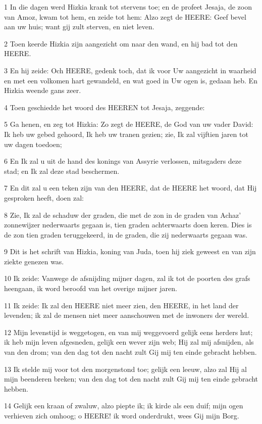 \par 1 In die dagen werd Hizkia krank tot stervens toe; en de profeet Jesaja, de zoon van Amoz, kwam tot hem, en zeide tot hem: Alzo zegt de HEERE: Geef bevel aan uw huis; want gij zult sterven, en niet leven.
\par 2 Toen keerde Hizkia zijn aangezicht om naar den wand, en hij bad tot den HEERE.
\par 3 En hij zeide: Och HEERE, gedenk toch, dat ik voor Uw aangezicht in waarheid en met een volkomen hart gewandeld, en wat goed in Uw ogen is, gedaan heb. En Hizkia weende gans zeer.
\par 4 Toen geschiedde het woord des HEEREN tot Jesaja, zeggende:
\par 5 Ga henen, en zeg tot Hizkia: Zo zegt de HEERE, de God van uw vader David: Ik heb uw gebed gehoord, Ik heb uw tranen gezien; zie, Ik zal vijftien jaren tot uw dagen toedoen;
\par 6 En Ik zal u uit de hand des konings van Assyrie verlossen, mitsgaders deze stad; en Ik zal deze stad beschermen.
\par 7 En dit zal u een teken zijn van den HEERE, dat de HEERE het woord, dat Hij gesproken heeft, doen zal:
\par 8 Zie, Ik zal de schaduw der graden, die met de zon in de graden van Achaz' zonnewijzer nederwaarts gegaan is, tien graden achterwaarts doen keren. Dies is de zon tien graden teruggekeerd, in de graden, die zij nederwaarts gegaan was.
\par 9 Dit is het schrift van Hizkia, koning van Juda, toen hij ziek geweest en van zijn ziekte genezen was.
\par 10 Ik zeide: Vanwege de afsnijding mijner dagen, zal ik tot de poorten des grafs heengaan, ik word beroofd van het overige mijner jaren.
\par 11 Ik zeide: Ik zal den HEERE niet meer zien, den HEERE, in het land der levenden; ik zal de mensen niet meer aanschouwen met de inwoners der wereld.
\par 12 Mijn levenstijd is weggetogen, en van mij weggevoerd gelijk eens herders hut; ik heb mijn leven afgesneden, gelijk een wever zijn web; Hij zal mij afsnijden, als van den drom; van den dag tot den nacht zult Gij mij ten einde gebracht hebben.
\par 13 Ik stelde mij voor tot den morgenstond toe; gelijk een leeuw, alzo zal Hij al mijn beenderen breken; van den dag tot den nacht zult Gij mij ten einde gebracht hebben.
\par 14 Gelijk een kraan of zwaluw, alzo piepte ik; ik kirde als een duif; mijn ogen verhieven zich omhoog; o HEERE! ik word onderdrukt, wees Gij mijn Borg.
